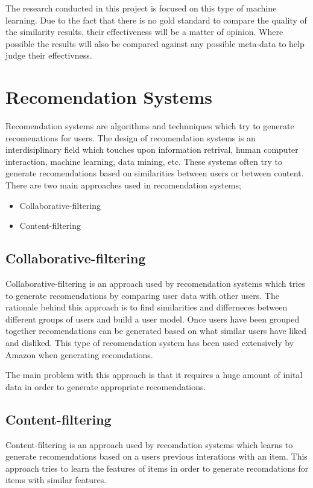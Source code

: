 The research conducted in this project is focused on this type of machine learning.
Due to the fact that there is no gold standard to compare the quality of the similarity results, their effectiveness will be a matter of opinion.
Where possible the results will also be compared against any possible meta-data to help judge their effectivness.

\section{Recomendation Systems}
Recomendation systems are algorithms and technniques which try to generate recomenations for users.
The design of recomendation systems is an interdisiplinary field which touches upon information retrival, human computer interaction, machine learning, data mining, etc.
These systems often try to generate recomendations based on similarities between users or between content.
There are two main approaches used in recomendation systems;

\begin{itemize}
    \item Collaborative-filtering
    \item Content-filtering
\end{itemize}

\subsection{Collaborative-filtering}
Collaborative-filtering is an approach used by recomendation systems which tries to generate recomendations by comparing user data with other users.
The rationale behind this approach is to find similarities and differneces  between different groups of users and build a user model.
Once users have been grouped together recomendations can be generated based on what similar users have liked and disliked.
This type of recomendation system has been used extensively by Amazon when generating recomdations.

The main problem with this approach is that it requires a huge amount of inital data in order to generate appropriate recomendations.

\subsection{Content-filtering}
Content-filtering is an approach used by recomdation systems which learns to generate recomendations based on a users previous interations with an item.
This approach tries to learn the features of items in order to generate recomdations for items with similar features.

